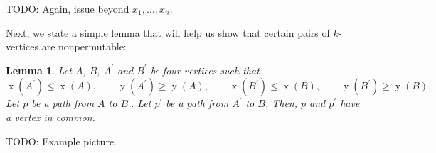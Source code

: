 \documentclass[reqno]{amsart}%
\newcommand{\0}{\phantom{c}}
\theoremstyle{plain}
\newtheorem{lemma}[thm]{Lemma}
\theoremstyle{definition}
\numberwithin{equation}{section}
\begin{document}
TODO: Again, issue beyond $x_{1},\ldots,x_{n}$.

Next, we state a simple lemma that will help us show that certain pairs of
$k$-vertices are nonpermutable:

\begin{lemma}
\label{lem.LGV.hex}Let $A$, $B$, $A^{\prime}$ and $B^{\prime}$ be four
vertices such that%
\[
\operatorname*{x}\left(  A^{\prime}\right)  \leq\operatorname*{x}\left(
A\right)  ,\qquad\operatorname*{y}\left(  A^{\prime}\right)  \geq
\operatorname*{y}\left(  A\right)  ,\qquad\operatorname*{x}\left(  B^{\prime
}\right)  \leq\operatorname*{x}\left(  B\right)  ,\qquad\operatorname*{y}%
\left(  B^{\prime}\right)  \geq\operatorname*{y}\left(  B\right)  .
\]
Let $p$ be a path from $A$ to $B^{\prime}$. Let $p^{\prime}$ be a path from
$A^{\prime}$ to $B$. Then, $p$ and $p^{\prime}$ have a vertex in common.
\end{lemma}

TODO: Example picture.
\end{document}
